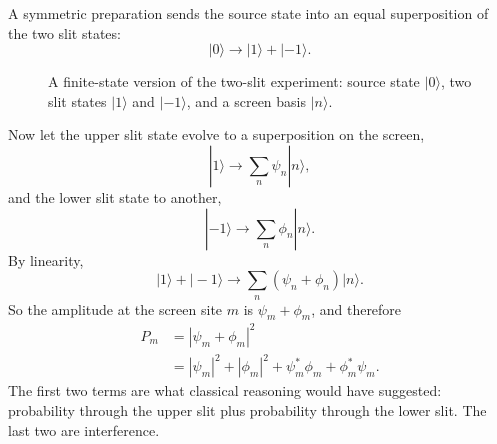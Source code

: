 A symmetric preparation sends the source state into an equal superposition of the two slit states:
\begin{equation}
|0\rangle \longrightarrow |1\rangle+|-1\rangle.
\end{equation}

\begin{figure}[htbp]
\centering
{}
\caption{A finite-state version of the two-slit experiment: source state \(|0\rangle\), two slit states \(|1\rangle\) and \(|-1\rangle\), and a screen basis \(|n\rangle\).}
\end{figure}

Now let the upper slit state evolve to a superposition on the screen,
\begin{equation}
|1\rangle \longrightarrow \sum_n \psi_n |n\rangle,
\end{equation}
and the lower slit state to another,
\begin{equation}
|-1\rangle \longrightarrow \sum_n \phi_n |n\rangle.
\end{equation}
By linearity,
\begin{equation}
|1\rangle+|-1\rangle \longrightarrow \sum_n (\psi_n+\phi_n)|n\rangle.
\end{equation}
So the amplitude at the screen site \(m\) is \(\psi_m+\phi_m\), and therefore
\begin{align}
P_m &= |\psi_m+\phi_m|^2 \\
    &= |\psi_m|^2+|\phi_m|^2+\psi_m^*\phi_m+\phi_m^*\psi_m.
\end{align}
The first two terms are what classical reasoning would have suggested: probability through the upper slit plus probability through the lower slit. The last two are interference.

